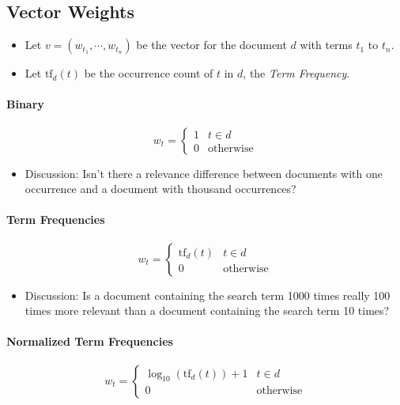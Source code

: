 		\subsection{Vector Weights} %
			\begin{itemize}
				\item Let \( v = (w_{t_1}, \cdots, w_{t_n}) \) be the vector for the document \( d \) with terms \( t_1 \) to \( t_n \).
				\item Let \( \text{tf}_d(t) \) be the occurrence count of \(t\) in \(d\), the \textit{Term Frequency}.
			\end{itemize}

			\paragraph{Binary} %
				\begin{equation*}
					w_t =
					\begin{cases}
						1 & t \in d          \\
						0 & \text{otherwise}
					\end{cases}
				\end{equation*}

				\begin{itemize}
					\item Discussion: Isn't there a relevance difference between documents with one occurrence and a document with thousand occurrences?
				\end{itemize}

			\paragraph{Term Frequencies} %
				\begin{equation*}
					w_t =
					\begin{cases}
						\text{tf}_d(t) & t \in d          \\
						0              & \text{otherwise}
					\end{cases}
				\end{equation*}

				\begin{itemize}
					\item Discussion: Is a document containing the search term 1000 times really 100 times more relevant than a document containing the search term 10 times?
				\end{itemize}

			\paragraph{Normalized Term Frequencies} %
				\begin{equation*}
					w_t =
					\begin{cases}
						\log_{10}(\text{tf}_d(t)) + 1 & t \in d          \\
						0                             & \text{otherwise}
					\end{cases}
				\end{equation*}

